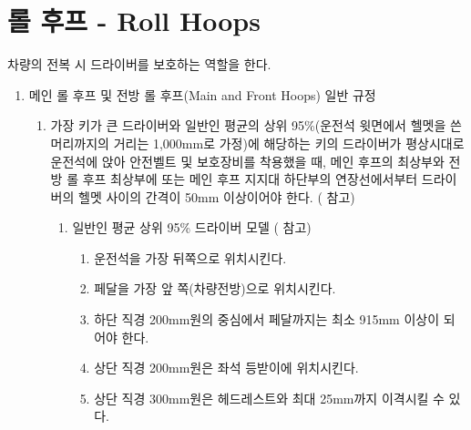 \documentclass[final,a4paper,10pt]{report}
\begin{document}
\section{롤 후프 - Roll Hoops}\label{rule:formula-technical.roll-hoops}
차량의 전복 시 드라이버를 보호하는 역할을 한다.

\begin{enumerate}
  \item\label{rule:formula-technical.roll-hoops.common} 메인 롤 후프 및 전방 롤 후프(Main and Front Hoops) 일반 규정
    \begin{enumerate}
      \item\label{rule:formula-technical.roll-hoops.common.helmet-clearance} 가장 키가 큰 드라이버와 일반인 평균의 상위 95\%(운전석 윗면에서 헬멧을 쓴 머리까지의 거리는 1,000mm로 가정)에 해당하는 키의 드라이버가 평상시대로 운전석에 앉아 안전벨트 및 보호장비를 착용했을 때, 메인 후프의 최상부와 전방 롤 후프 최상부에 또는 메인 후프 지지대 하단부의 연장선에서부터 드라이버의 헬멧 사이의 간격이 50mm 이상이어야 한다. ( 참고)
        \begin{enumerate}
          \item\label{rule:formula-technical.roll-hoops.common.helmet-clearance.percy-template} 일반인 평균 상위 95\% 드라이버 모델 ( 참고)
          \begin{enumerate}
            \item\label{rule:formula-technical.roll-hoops.common.helmet-clearance.percy-template.seat-full-rearward} 운전석을 가장 뒤쪽으로 위치시킨다.
            \item\label{rule:formula-technical.roll-hoops.common.helmet-clearance.percy-template.pedals-full-forward} 페달을 가장 앞 쪽(차량전방)으로 위치시킨다.
            \item\label{rule:formula-technical.roll-hoops.common.helmet-clearance.percy-template.lower-circle-pedal-915mm} 하단 직경 200mm원의 중심에서 페달까지는 최소 915mm 이상이 되어야 한다.
            \item\label{rule:formula-technical.roll-hoops.common.helmet-clearance.percy-template.upper-circle-at-seatback} 상단 직경 200mm원은 좌석 등받이에 위치시킨다.
            \item\label{rule:formula-technical.roll-hoops.common.helmet-clearance.percy-template.headrest-offset-max-25mm} 상단 직경 300mm원은 헤드레스트와 최대 25mm까지 이격시킬 수 있다.
          \end{enumerate}
        \end{enumerate}


\end{enumerate}
\end{enumerate}
\end{document}
